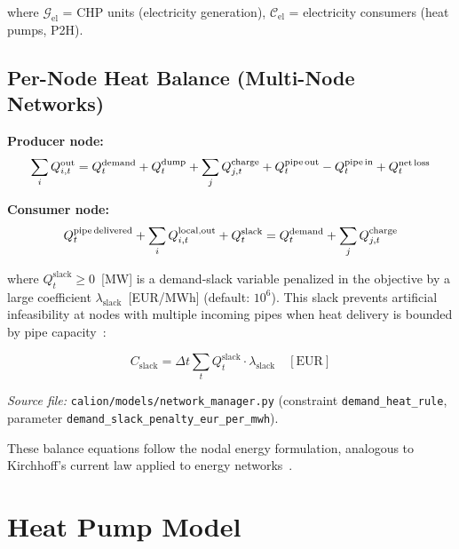 \documentclass[a4paper,12pt]{article}
\begin{document}
where $\mathcal{G}_{\text{el}}$ = CHP units (electricity generation),
$\mathcal{C}_{\text{el}}$ = electricity consumers (heat pumps, P2H).

\subsection{Per-Node Heat Balance (Multi-Node Networks)}

\noindent\textbf{Producer node:}
\begin{equation}
  \sum_{i} Q^{\text{out}}_{i,t}
  = Q^{\text{demand}}_{t} + Q^{\text{dump}}_{t}
    + \sum_{j} Q^{\text{charge}}_{j,t}
    + Q^{\text{pipe\,out}}_{t} - Q^{\text{pipe\,in}}_{t}
    + Q^{\text{net\,loss}}_{t}
  \label{eq:producer-node}
\end{equation}

\noindent\textbf{Consumer node:}
\begin{equation}
  Q^{\text{pipe\,delivered}}_{t} + \sum_{i} Q^{\text{local,out}}_{i,t} + Q^{\text{slack}}_{t}
  = Q^{\text{demand}}_{t} + \sum_{j} Q^{\text{charge}}_{j,t}
  \label{eq:consumer-node}
\end{equation}

where $Q^{\text{slack}}_{t} \geq 0$~[MW] is a demand-slack variable penalized in the
objective by a large coefficient $\lambda_{\text{slack}}$~[EUR/MWh] (default: $10^6$).
This slack prevents artificial infeasibility at nodes with multiple incoming pipes when
heat delivery is bounded by pipe capacity~\cite{Pfenninger2014}:

\begin{equation}
  C_{\text{slack}} = \Delta t \sum_{t} Q^{\text{slack}}_{t} \cdot \lambda_{\text{slack}}
  \quad [\text{EUR}]
  \label{eq:slack-cost}
\end{equation}

\noindent\textit{Source file:} \texttt{calion/models/network\_manager.py}
(constraint \texttt{demand\_heat\_rule}, parameter \texttt{demand\_slack\_penalty\_eur\_per\_mwh}).

These balance equations follow the nodal energy formulation, analogous to Kirchhoff's
current law applied to energy networks~\cite{Vesterlund2017,Lund2016b}.

\section{Heat Pump Model}
\label{sec:hp}
\end{document}
